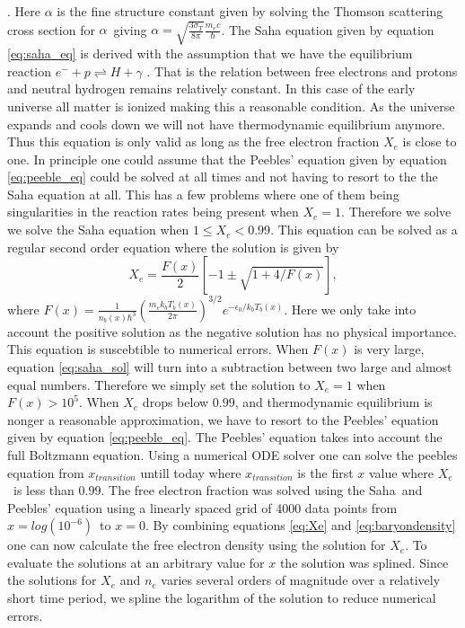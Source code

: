 \documentclass[onecolumn]{aastex62}
\begin{document}
\cite{WintherII:2020}. Here $\alpha$ is the fine structure constant given by solving the Thomson scattering cross section for $\alpha$ giving $\alpha=\sqrt{\frac{3\sigma_T}{8\pi}}\frac{m_e c}{\hbar}$. The Saha equation given by equation \ref{eq:saha_eq} is derived with the assumption that we have the equilibrium reaction $e^- +p\rightleftharpoons H+\gamma$ \cite[p.70]{Dodelson:1282338}. That is the relation between free electrons and protons and neutral hydrogen remains relatively constant. In this case of the early universe all matter is ionized making this a reasonable condition. As the universe expands and cools down we will not have thermodynamic equilibrium anymore. Thus this equation is only valid as long as the free electron fraction $X_e$ is close to one. In principle one could assume that the Peebles' equation given by equation \ref{eq:peeble_eq} could be solved at all times and not having to resort to the the Saha equation at all. This has a few problems where one of them being singularities in the reaction rates being present when $X_e=1$. Therefore we solve we solve the Saha equation when $1\leq X_e<0.99$. This equation can be solved as a regular second order equation where the solution is given by
\begin{equation}\label{eq:saha_sol}
    X_e = \frac{F(x)}{2}\left[-1\pm\sqrt{1+4/F(x)}\right],
\end{equation}
where $F(x)=\frac{1}{n_b(x)\hbar^3} \left(\frac{m_ek_bT_b(x)}{2\pi}\right)^{3/2} e^{-\epsilon_0/k_bT_b(x)}$. Here we only take into account the positive solution as the negative solution has no physical importance. This equation is suscebtible to numerical errors. When $F(x)$ is very large, equation \ref{eq:saha_sol} will turn into a subtraction between two large and almost equal numbers. Therefore we simply set the solution to $X_e=1$ when $F(x)>10^5$. When $X_e$ drops below $0.99$, and thermodynamic equilibrium is nonger a reasonable approximation, we have to resort to the Peebles' equation given by equation \ref{eq:peeble_eq}. The Peebles' equation takes into account the full Boltzmann equation. Using a numerical ODE solver one can solve the peebles equation from $x_{transition}$ untill today where $x_{transition}$ is the first $x$ value where $X_e$ is less than $0.99$. The free electron fraction was solved using the Saha and Peebles' equation using a linearly spaced grid of $4000$ data points from $x=log(10^{-6})$ to $x=0$. By combining equations \ref{eq:Xe} and \ref{eq:baryondensity} one can now calculate the free electron density using the solution for $X_e$. To evaluate the solutions at an arbitrary value for $x$ the solution was splined. Since the solutions for $X_e$ and $n_e$ varies several orders of magnitude over a relatively short time period, we spline the logarithm of the solution to reduce numerical errors.
\end{document}
